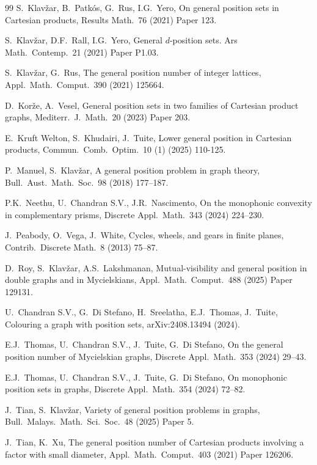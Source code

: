 \documentclass[12pt]{article}
\begin{document}
\begin{thebibliography}{99}
S.~Klav\v{z}ar, B.~Patk\'{o}s, G.~Rus, I.G.~Yero, 
On general position sets in {C}artesian products,
Results Math.\ 76 (2021) Paper 123.

S.~Klav\v zar, D.F.~Rall, I.G.~Yero,
General $d$-position sets.
Ars Math.\ Contemp.\ 21 (2021) Paper P1.03.

S.~Klav\v zar, G.~Rus,
The general position number of integer lattices, 
Appl.\ Math.\ Comput.\ 390 (2021) 125664.

D.~Kor\v{z}e, A.~Vesel, 
General position sets in two families of Cartesian product graphs,
Mediterr.\ J.\ Math.\ 20 (2023) Paper 203.

E.~Kruft Welton, S.~Khudairi, J.~Tuite,
Lower general position in Cartesian products,
Commun.\ Comb.\ Optim.\  10 (1) (2025) 110-125.

P.~Manuel, S.~Klav\v{z}ar,
A general position problem in graph theory,
Bull.\ Aust.\ Math.\ Soc.\ 98 (2018) 177--187.

P.K.~Neethu, U.~Chandran S.V., J.R.~Nascimento,
On the monophonic convexity in complementary prisms,
Discrete Appl.\ Math.\ 343 (2024) 224--230. 

J.~Peabody, O.~Vega, J.~White, 
Cycles, wheels, and gears in finite planes,
Contrib.\ Discrete Math.\ 8 (2013) 75--87.

D.~Roy, S.~Klav\v{z}ar, A.S.~Lakshmanan,
Mutual-visibility and general position in double
graphs and in Mycielskians,
Appl.\ Math.\ Comput.\ 488 (2025) Paper 129131.

 U.~Chandran S.V., G.~Di Stefano, H.~Sreelatha, E.J.~Thomas, J.~Tuite, 
Colouring a graph with position sets, 
arXiv:2408.13494 (2024).

E.J.~Thomas, U.~Chandran S.V., J.~Tuite, G.~Di Stefano,
On the general position number of Mycielskian graphs,
Discrete Appl.\ Math.\ 353 (2024) 29--43. 

E.J.~Thomas, U.~Chandran S.V., J.~Tuite, G.~Di Stefano,
On monophonic position sets in graphs,
Discrete Appl.\ Math.\ 354 (2024) 72--82. 

J.~Tian, S.~Klav\v{z}ar,
Variety of general position problems in graphs, 
Bull.\ Malays.\ Math.\ Sci.\ Soc.\ 48 (2025) Paper 5. 

J.~Tian, K.~Xu,
The general position number of Cartesian products involving a factor with small diameter,
Appl.\ Math.\ Comput.\ 403 (2021) Paper 126206.


\end{thebibliography}
\end{document}
